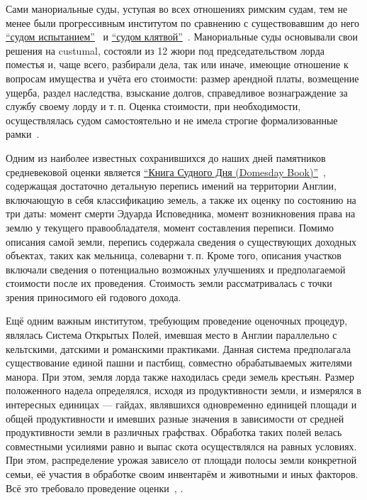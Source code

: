 \documentclass[12pt]{scrartcl}
\begin{document}
Сами манориальные суды, уступая во всех отношениях римским судам, тем не менее были прогрессивным институтом по сравнению с существовавшим до него \href{https://en.wikipedia.org/wiki/Trial_by_ordeal}{``судом испытанием''}~\cite{trial_ordeal} и \href{https://en.wikipedia.org/wiki/Compurgation}{``судом клятвой''}~\cite{compurgation}. Манориальные суды основывали свои решения на custumal, состояли из 12 жюри под председательством лорда поместья и, чаще всего, разбирали дела, так или иначе, имеющие отношение к вопросам имущества и учёта его стоимости: размер арендной платы, возмещение ущерба, раздел наследства, взыскание долгов, справедливое вознаграждение за службу своему лорду и т.\,п. Оценка стоимости, при необходимости, осуществлялась судом самостоятельно и не имела строгие формализованные рамки~\cite{Maitland1907}.

Одним из наиболее известных сохранившихся до наших дней памятников средневековой оценки является \href{http://www.domesdaybook.co.uk/index.html}{``Книга Судного Дня (Domesday Book)''}~\cite{domesdaybook}, содержащая достаточно детальную перепись имений на территории Англии, включающую в себя классификацию земель, а также их оценку по состоянию на три даты: момент смерти Эдуарда Исповедника, момент возникновения права на землю у текущего правообладателя, момент составления переписи. Помимо описания самой земли, перепись содержала сведения о существующих доходных объектах, таких как мельница, солеварни т.\,п. Кроме того, описания участков включали сведения о потенциально возможных улучшениях и предполагаемой стоимости после их проведения. Стоимость земли рассматривалась с точки зрения приносимого ей годового дохода.

Ещё одним важным институтом, требующим проведение оценочных процедур, являлась Система Открытых Полей, имевшая место в Англии параллельно с кельтскими, датскими и романскими практиками. Данная система предполагала существование единой пашни и пастбищ, совместно обрабатываемых жителями манора. При этом, земля лорда также находилась среди земель крестьян. Размер положенного надела определялся, исходя из продуктивности земли, и измерялся в интересных единицах --- гайдах, являвшихся одновременно единицей площади и общей продуктивности и имевших разные значения в зависимости от средней продуктивности земли в различных графствах. Обработка таких полей велась совместными усилиями равно и выпас скота осуществлялся на равных условиях. При этом, распределение урожая зависело от площади полосы земли конкретной семьи, её участия в обработке своим инвентарём и животными и иных факторов. Всё это требовало проведение оценки~\cite{Powell2011}, \cite{McCloskey1972}.
\end{document}
